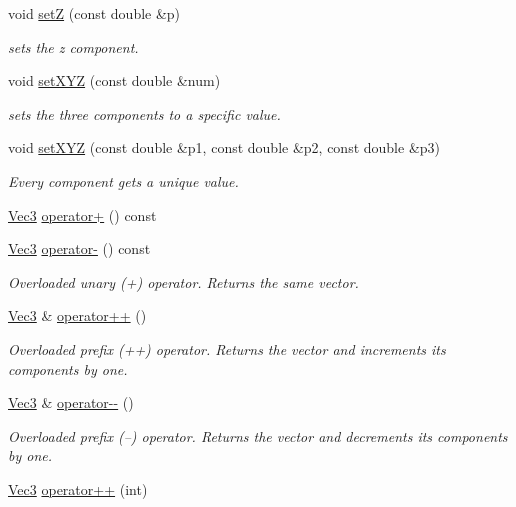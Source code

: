\begin{DoxyCompactItemize}
void \mbox{\hyperlink{classVec3_a82a4d4efb9e16963297de236abf2fa45}{setZ}} (const double \&p)
\begin{DoxyCompactList}\small\item\em sets the z component. \end{DoxyCompactList}\item 
void \mbox{\hyperlink{classVec3_a36ab02d30acfd240bbc258f60ee69159}{set\+X\+YZ}} (const double \&num)
\begin{DoxyCompactList}\small\item\em sets the three components to a specific value. \end{DoxyCompactList}\item 
void \mbox{\hyperlink{classVec3_a4905f9155ba4489cd41dc76f1c8a38d2}{set\+X\+YZ}} (const double \&p1, const double \&p2, const double \&p3)
\begin{DoxyCompactList}\small\item\em Every component gets a unique value. \end{DoxyCompactList}\item 
\mbox{\hyperlink{classVec3}{Vec3}} \mbox{\hyperlink{classVec3_a188ff41ed049900acd16db6ac9d5ec4f}{operator+}} () const
\item 
\mbox{\hyperlink{classVec3}{Vec3}} \mbox{\hyperlink{classVec3_ab05753413af282b8cbd879c334c8e5aa}{operator-\/}} () const
\begin{DoxyCompactList}\small\item\em Overloaded unary (+) operator. Returns the same vector. \end{DoxyCompactList}\item 
\mbox{\hyperlink{classVec3}{Vec3}} \& \mbox{\hyperlink{classVec3_a42af411be3202a44ae293cd5bfb50831}{operator++}} ()
\begin{DoxyCompactList}\small\item\em Overloaded prefix (++) operator. Returns the vector and increments its components by one. \end{DoxyCompactList}\item 
\mbox{\hyperlink{classVec3}{Vec3}} \& \mbox{\hyperlink{classVec3_a520715cf438384a71bbdb4a47476501d}{operator-\/-\/}} ()
\begin{DoxyCompactList}\small\item\em Overloaded prefix (--) operator. Returns the vector and decrements its components by one. \end{DoxyCompactList}\item 
\mbox{\hyperlink{classVec3}{Vec3}} \mbox{\hyperlink{classVec3_a847d6f000968553c2cf6b4780742a8c1}{operator++}} (int)

\end{DoxyCompactItemize}
